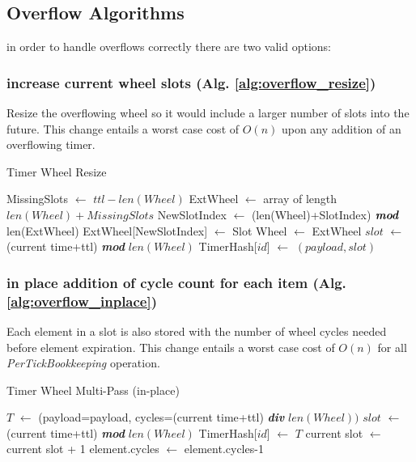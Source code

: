 \documentclass[conference]{IEEEtran}
\newcommand*\Let[2]{\State #1 $\gets$ #2}
\begin{document}
\subsection{Overflow Algorithms}
in order to handle overflows correctly there are two valid options:
\subsubsection{increase current wheel slots (Alg. \ref{alg:overflow_resize})} Resize the overflowing wheel so it would include a larger number of slots into the future. This change entails a worst case cost of $O(n)$ upon any addition of an overflowing timer.

\begin{algorithm}
	\caption{Timer Wheel Resize\label{alg:overflow_resize}}
	\begin{algorithmic}[1]
		\Let{MissingSlots}{$ttl-len(Wheel)$}
		\Let{ExtWheel}{array of length $len(Wheel) + MissingSlots$}
		\Let{NewSlotIndex}{(len(Wheel)+SlotIndex) $\textit{\textbf{mod}}$ len(ExtWheel) }
		\Let{ExtWheel[NewSlotIndex]}{Slot}
		\EndFor
		\Let{Wheel}{ExtWheel}
		\EndIf
		\Let{$slot$}{(current time+ttl) \textit{\textbf{mod}} $len(Wheel)$}
		\Let{TimerHash[$id$]}{$(payload,slot)$}
		\EndFunction
	\end{algorithmic}
\end{algorithm}


\subsubsection{in place addition of cycle count for each item (Alg. \ref{alg:overflow_inplace})} Each element in a slot is also stored with the number of wheel cycles needed before element expiration. This change entails a worst case cost of $O(n)$ for all \textit{PerTickBookkeeping} operation.

\begin{algorithm}
	\caption{Timer Wheel Multi-Pass (in-place)\label{alg:overflow_inplace}}
	\begin{algorithmic}[1]
		\Statex
		\Let{$T$}{(payload=payload, cycles=(current time+ttl) \textit{\textbf{div}} $len(Wheel))$}
		\Let{$slot$}{(current time+ttl) \textit{\textbf{mod}} $len(Wheel)$}
		\Let{TimerHash[$id$]}{$T$}
		\EndFunction
		\Statex
		\Let{current slot}{current slot + 1} 
			\Let{element.cycles}{element.cycles-1}
			\EndIf
		\EndFor
		\EndFunction
	\end{algorithmic}
\end{algorithm}
\end{document}
